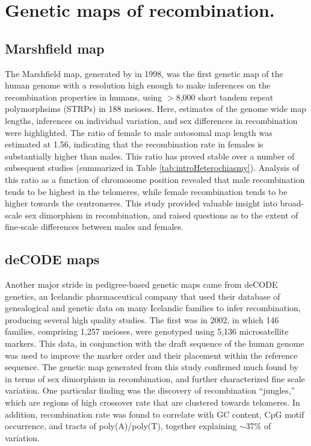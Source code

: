 \section{Genetic maps of recombination.}

\subsection{Marshfield map}
The Marshfield map, generated by \citet{Broman1998} in 1998, was the first genetic map of the human genome with a resolution high enough to make inferences on the recombination properties in humans, using $>$8,000 short tandem repeat polymorphsims (STRPs) in 188 meioses.
Here, estimates of the genome wide map lengths, inferences on individual variation, and sex differences in recombination were highlighted.
The ratio of female to male autosomal map length was estimated at 1.56, indicating that the recombination rate in females is substantially higher than males.
This ratio has proved stable over a number of subsequent studies (summarized in Table \ref{tab:introHeterochiasmy}).
Analysis of this ratio as a function of chromosome position revealed that male recombination tends to be highest in the telomeres, while female recombination tends to be higher towards the centromeres.
This study provided valuable insight into broad-scale sex dimorphism in recombination, and raised questions as to the extent of fine-scale differences between males and females.

\subsection{deCODE maps}
Another major stride in pedigree-based genetic maps came from deCODE genetics, an Icelandic pharmaceutical company that used their database of genealogical and genetic data on many Icelandic families to infer recombination, producing several high quality studies.
The first was in 2002, in which 146 families, comprising 1,257 meioses, were genotyped using 5,136 microsatellite markers\cite{Kong2002}.
This data, in conjunction with the draft sequence of the human genome\cite{Venter2001,Lander2001} was used to improve the marker order and their placement within the reference sequence.
The genetic map generated from this study confirmed much found by \citet{Broman1998} in terms of sex dimorphism in recombination, and further characterized fine scale variation.
One particular finding was the discovery of recombination ``jungles,'' which are regions of high crossover rate that are clustered towards telomeres.
In addition, recombination rate was found to correlate with GC content, CpG motif occurrence, and tracts of poly(A)/poly(T), together explaining $\sim$37\% of variation.


